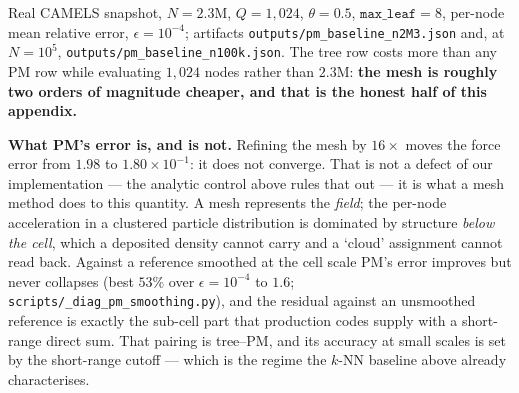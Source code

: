\begin{center}
\end{center}

\noindent Real CAMELS snapshot, $N=2.3$M, $Q=1{,}024$, $\theta=0.5$, $\texttt{max\_leaf}=8$, per-node
mean relative error, $\epsilon=10^{-4}$; artifacts \texttt{outputs/\allowbreak pm\_\allowbreak baseline\_\allowbreak n2M3.\allowbreak json} and, at
$N=10^{5}$, \texttt{outputs/\allowbreak pm\_\allowbreak baseline\_\allowbreak n100k.\allowbreak json}. The tree row costs more than any PM row while
evaluating $1{,}024$ nodes rather than $2.3$M: \textbf{the mesh is roughly two orders of magnitude
cheaper, and that is the honest half of this appendix.}

\noindent\textbf{What PM's error is, and is not.} Refining the mesh by $16\times$ moves the force error
from $1.98$ to $1.80\times10^{-1}$: it does not converge. That is not a defect of our implementation
--- the analytic control above rules that out --- it is what a mesh method does to this quantity. A
mesh represents the \emph{field}; the per-node acceleration in a clustered particle distribution is
dominated by structure \emph{below the cell}, which a deposited density cannot carry and a `cloud'
assignment cannot read back. Against a reference smoothed at the cell scale PM's error improves but
never collapses (best $53\%$ over $\epsilon=10^{-4}$ to $1.6$;
\texttt{scripts/\allowbreak \_\allowbreak diag\_\allowbreak pm\_\allowbreak smoothing.\allowbreak py}), and the residual against an unsmoothed reference is
exactly the sub-cell part that production codes supply with a short-range direct sum. That pairing is
tree--PM, and its accuracy at small scales is set by the short-range cutoff --- which is the regime the
$k$-NN baseline above already characterises.

